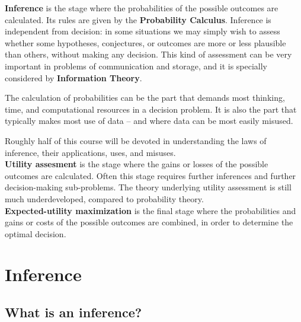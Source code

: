 \documentclass[
  a4paper,
  DIV=11,
  numbers=noendperiod,
  oneside]{scrreprt}
\begin{document}
{ \textbf{Inference}} is the stage where the probabilities
of the possible outcomes are calculated. Its rules are given by the
{\textbf{Probability Calculus}}. Inference is independent from decision:
in some situations we may simply wish to assess whether some hypotheses,
conjectures, or outcomes are more or less plausible than others, without
making any decision. This kind of assessment can be very important in
problems of communication and storage, and it is specially considered by
{\textbf{Information Theory}}.

The calculation of probabilities can be the part that demands most
thinking, time, and computational resources in a decision problem. It is
also the part that typically makes most use of data -- and where data
can be most easily misused.

Roughly half of this course will be devoted in understanding the laws of
inference, their applications, uses, and misuses.\\

{ \textbf{Utility assesment}} is the stage where the gains
or losses of the possible outcomes are calculated. Often this stage
requires further inferences and further decision-making sub-problems.
The theory underlying utility assessment is still much underdeveloped,
compared to probability theory.\\

{ \textbf{Expected-utility maximization}} is the final
stage where the probabilities and gains or costs of the possible
outcomes are combined, in order to determine the optimal decision.

\part{Inference}

\hypertarget{what-is-an-inference}{%
\chapter{What is an inference?}\label{what-is-an-inference}}

\providecommand{\ul}{\uline}
\renewcommand*{\|}[1][]{\nonscript\:#1\vert\nonscript\:\mathopen{}}
\providecommand*{\pr}[1]{\textsf{\small`#1'}}
\renewcommand*{\pr}[1]{\textsf{\small`#1'}}
\providecommand*{\prq}[1]{\textsf{\small #1}}

\providecommand{\se}[1]{\mathsfit{#1}}
\renewcommand{\se}[1]{\mathsfit{#1}}
\providecommand{\p}{\mathrm{p}}
\renewcommand{\p}{\mathrm{p}}
\renewcommand{\P}{\mathrm{P}}
\end{document}

